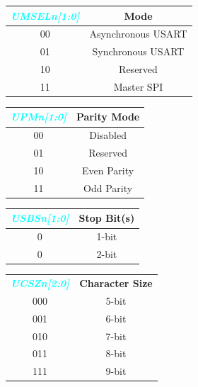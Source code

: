 \documentclass{article}
\newcommand{\bitFormat}[1]{\emph{\textbf{\textcolor{cyan}{#1}}}}
\begin{document}
\begin{table}[H]    
\begin{minipage}{0.4\linewidth}
    \begin{tabular}{c|c}
        \bitFormat{UMSELn[1:0]} & \textbf{Mode}\\
        \hline
        00 & Asynchronous USART\\
        01 & Synchronous USART\\
        10 & Reserved\\
        11 & Master SPI\\
    \end{tabular}
\end{minipage}
\begin{minipage}{0.3\linewidth}
    \begin{tabular}{c|c}
        \bitFormat{UPMn[1:0]} & \textbf{Parity Mode}\\
        \hline
        00 & Disabled\\
        01 & Reserved\\
        10 & Even Parity\\
        11 & Odd Parity\\
    \end{tabular}
\end{minipage}
\begin{minipage}{0.29\linewidth}
    \begin{tabular}{c|c}
        \bitFormat{USBSn[1:0]} & \textbf{Stop Bit(s)}\\
        \hline
        0 & 1-bit\\
        0 & 2-bit\\
    \end{tabular}
\end{minipage}
\end{table}

\begin{table}[H]
    \begin{center}
        \begin{tabular}{c|c}
            \bitFormat{UCSZn[2:0]} & \textbf{Character Size}\\
            000 & 5-bit\\
            001 & 6-bit\\
            010 & 7-bit\\
            011 & 8-bit\\
            111 & 9-bit\\
        \end{tabular}
    \end{center}
\end{table}
\end{document}
